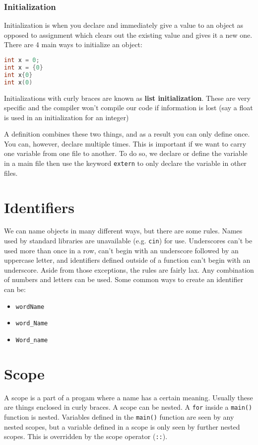 \documentclass[12pt, a4paper]{report}
\begin{document}
\subsubsection{Initialization}
Initialization is when you declare and immediately give a value to an object as opposed to assignment which clears out the existing value and gives it a new one.
There are 4 main ways to initialize an object:
\begin{lstlisting}[language=C++]
int x = 0;
int x = {0}
int x{0}
int x(0)
\end{lstlisting}
Initializations with curly braces are known as \textbf{list initialization}. These are very specific and the compiler won't compile our code if information is lost (say a float is used in an initialization for an integer)

A definition combines these two things, and as a result you can only define once. You can, however, declare multiple times.
This is important if we want to carry one variable from one file to another. To do so, we declare or define the variable in a main file then use the keyword \verb|extern| to only declare the variable in other files.
\section{Identifiers}
We can name objects in many different ways, but there are some rules. Names used by standard libraries are unavailable (e.g. \verb|cin|) for use. Underscores can't be used more than once in a row, can't begin with an underscore followed by an uppercase letter, and identifiers defined outside of a function can't begin with an underscore. Aside from those exceptions, the rules are fairly lax. Any combination of numbers and letters can be used. Some common ways to create an identifier can be:
\begin{center}
	\begin{itemize}
		\item \verb|wordName|
		\item \verb|word_Name|
		\item \verb|Word_name|
	\end{itemize}
\end{center}
\section{Scope}
A scope is a part of a progam where a name has a certain meaning. Usually these are things enclosed in curly braces. A scope can be nested. A \verb|for| inside a \verb|main()| function is nested. Variables defined in the \verb|main()| function are seen by any nested scopes, but a variable defined in a scope is only seen by further nested scopes. This is overridden by the scope operator (\verb|::|).
\end{document}

